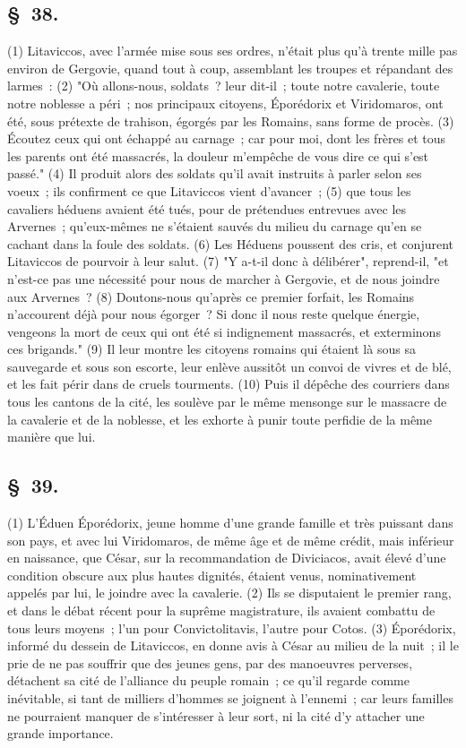 \documentclass[french,twoside]{book} %
\begin{document}
\subsection[{§ 38.}]{ \textsc{§ 38.} }
\noindent (1) Litaviccos, avec l’armée mise sous ses ordres, n’était plus qu’à trente mille pas environ de Gergovie, quand tout à coup, assemblant les troupes et répandant des larmes : (2) "Où allons-nous, soldats ? leur dit-il ; toute notre cavalerie, toute notre noblesse a péri ; nos principaux citoyens, Éporédorix et Viridomaros, ont été, sous prétexte de trahison, égorgés par les Romains, sans forme de procès. (3) Écoutez ceux qui ont échappé au carnage ; car pour moi, dont les frères et tous les parents ont été massacrés, la douleur m’empêche de vous dire ce qui s’est passé." (4) Il produit alors des soldats qu’il avait instruits à parler selon ses voeux ; ils confirment ce que Litaviccos vient d’avancer ; (5) que tous les cavaliers héduens avaient été tués, pour de prétendues entrevues avec les Arvernes ; qu’eux-mêmes ne s’étaient sauvés du milieu du carnage qu’en se cachant dans la foule des soldats. (6) Les Héduens poussent des cris, et conjurent Litaviccos de pourvoir à leur salut. (7) "Y a-t-il donc à délibérer", reprend-il, "et n’est-ce pas une nécessité pour nous de marcher à Gergovie, et de nous joindre aux Arvernes ? (8) Doutons-nous qu’après ce premier forfait, les Romains n’accourent déjà pour nous égorger ? Si donc il nous reste quelque énergie, vengeons la mort de ceux qui ont été si indignement massacrés, et exterminons ces brigands." (9) Il leur montre les citoyens romains qui étaient là sous sa sauvegarde et sous son escorte, leur enlève aussitôt un convoi de vivres et de blé, et les fait périr dans de cruels tourments. (10) Puis il dépêche des courriers dans tous les cantons de la cité, les soulève par le même mensonge sur le massacre de la cavalerie et de la noblesse, et les exhorte à punir toute perfidie de la même manière que lui.
\subsection[{§ 39.}]{ \textsc{§ 39.} }
\noindent (1) L'Éduen Éporédorix, jeune homme d’une grande famille et très puissant dans son pays, et avec lui Viridomaros, de même âge et de même crédit, mais inférieur en naissance, que César, sur la recommandation de Diviciacos, avait élevé d’une condition obscure aux plus hautes dignités, étaient venus, nominativement appelés par lui, le joindre avec la cavalerie. (2) Ils se disputaient le premier rang, et dans le débat récent pour la suprême magistrature, ils avaient combattu de tous leurs moyens ; l’un pour Convictolitavis, l’autre pour Cotos. (3) Éporédorix, informé du dessein de Litaviccos, en donne avis à César au milieu de la nuit ; il le prie de ne pas souffrir que des jeunes gens, par des manoeuvres perverses, détachent sa cité de l’alliance du peuple romain ; ce qu’il regarde comme inévitable, si tant de milliers d’hommes se joignent à l’ennemi ; car leurs familles ne pourraient manquer de s’intéresser à leur sort, ni la cité d’y attacher une grande importance.
\end{document}
